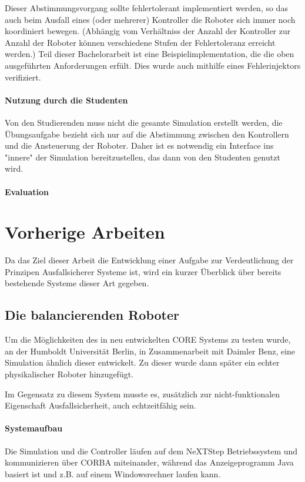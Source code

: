 \documentclass[
    12pt,
    bibliography=totoc,
    ngerman
]{scrartcl}
\begin{document}
Dieser Abstimmungsvorgang sollte fehlertolerant implementiert werden, so das auch beim Ausfall eines (oder mehrerer) Kontroller die Roboter sich immer noch koordiniert bewegen. (Abh{\"{a}}ngig vom Verh{\"{a}}ltniss der Anzahl der Kontroller zur
Anzahl der Roboter k{\"{o}}nnen verschiedene Stufen der Fehlertoleranz erreicht werden.\cite[s.149]{Werner00})
Teil dieser Bachelorarbeit ist eine
Beispielimplementation, die die oben ausgef{\"{u}}hrten Anforderungen erf{\"{u}}lt. Dies wurde auch mithilfe eines Fehlerinjektors verifiziert.

\paragraph{Nutzung durch die Studenten} Von den Studierenden muss nicht die gesamte Simulation erstellt werden, die {\"{U}}bungsaufgabe bezieht sich nur auf die Abstimmung zwischen den Kontrollern und die Ansteuerung der Roboter.
Daher ist es notwendig ein Interface ins "innere" der Simulation bereitzustellen, das dann von den Studenten genutzt wird.

\paragraph{Evaluation} 

\clearpage
\section{Vorherige Arbeiten}
Da das Ziel dieser Arbeit die Entwicklung einer Aufgabe zur Verdeutlichung der Prinzipen Ausfallsicherer Systeme ist, wird ein kurzer {\"{U}}berblick {\"{u}}ber bereits bestehende Systeme dieser Art gegeben.

\subsection{Die balancierenden Roboter}
Um die M{\"{o}}glichkeiten des in \cite{Werner00} neu entwickelten CORE Systems zu testen wurde, an der Humboldt Universit{\"{a}}t Berlin, in Zusammenarbeit
mit Daimler Benz, eine Simulation {\"{a}}hnlich dieser entwickelt. Zu dieser wurde dann sp{\"{a}}ter ein echter physikalischer Roboter hinzugef{\"{u}}gt.

Im Gegensatz zu diesem System musste es, zus{\"{a}}tzlich zur nicht-funktionalen Eigenschaft Ausfallsicherheit, auch echtzeitf{\"{a}}hig sein.

\paragraph{Systemaufbau} Die Simulation und die Controller l{\"{a}}ufen auf dem NeXTStep Betriebssystem und kommunizieren {\"{u}}ber CORBA miteinander\cite{predictablecorba}, w{\"{a}}hrend
das Anzeigeprogramm Java basiert ist und z.B. auf einem Windowsrechner laufen kann.
\end{document}
